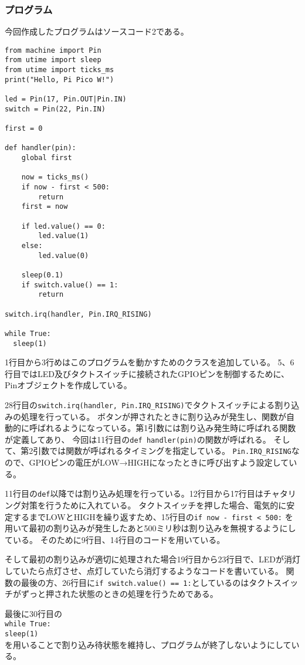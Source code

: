 \documentclass[dvipdfmx]{jsarticle}
\begin{document}
\subsubsection{プログラム}
今回作成したプログラムはソースコード2である。
\begin{lstlisting}[caption={main.py}]
from machine import Pin
from utime import sleep
from utime import ticks_ms
print("Hello, Pi Pico W!")

led = Pin(17, Pin.OUT|Pin.IN)
switch = Pin(22, Pin.IN)

first = 0

def handler(pin):
    global first

    now = ticks_ms()
    if now - first < 500:
        return
    first = now

    if led.value() == 0:
        led.value(1)
    else:
        led.value(0)

    sleep(0.1)
    if switch.value() == 1:
        return 

switch.irq(handler, Pin.IRQ_RISING)

while True:
  sleep(1)
\end{lstlisting}
1行目から3行めはこのプログラムを動かすためのクラスを追加している。
5、6行目ではLED及びタクトスイッチに接続されたGPIOピンを制御するために、Pinオブジェクトを作成している。

28行目の\texttt{switch.irq(handler, Pin.IRQ\_RISING)}でタクトスイッチによる割り込みの処理を行っている。
ボタンが押されたときに割り込みが発生し、関数が自動的に呼ばれるようになっている。第1引数には割り込み発生時に呼ばれる関数が定義してあり、
今回は11行目の\texttt{def handler(pin)}の関数が呼ばれる。
そして、第2引数では関数が呼ばれるタイミングを指定している。
\texttt{Pin.IRQ\_RISING}なので、GPIOピンの電圧がLOW→HIGHになったときに呼び出すよう設定している。

11行目の\texttt{def}以降では割り込み処理を行っている。12行目から17行目はチャタリング対策を行うために入れている。
タクトスイッチを押した場合、電気的に安定するまでLOWとHIGHを繰り返すため、15行目の\texttt{if now - first < 500:}
を用いて最初の割り込みが発生したあと500ミリ秒は割り込みを無視するようにしている。
そのために9行目、14行目のコードを用いている。

そして最初の割り込みが適切に処理された場合19行目から23行目で、LEDが消灯していたら点灯させ、点灯していたら消灯するようなコードを書いている。
関数の最後の方、26行目に\texttt{if switch.value() == 1:}としているのはタクトスイッチがずっと押された状態のときの処理を行うためである。

最後に30行目の\\\texttt{while True:\\sleep(1)}\\
を用いることで割り込み待状態を維持し、プログラムが終了しないようにしている。
\end{document}
